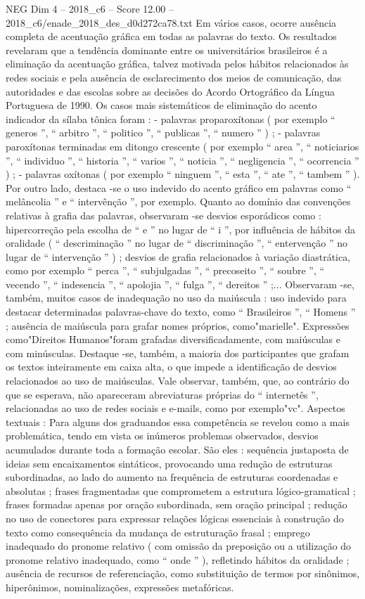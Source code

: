 \begin{textsample}{NEG Dim 4 – 2018\_c6 – Score 12.00 – 2018\_c6/enade\_2018\_des\_d0d272ca78.txt}
Em vários casos, ocorre ausência completa de acentuação gráfica em todas as palavras do texto.
Os resultados revelaram que a tendência dominante entre os universitários brasileiros é a eliminação da acentuação gráfica, talvez motivada pelos hábitos relacionados às redes sociais e pela ausência de esclarecimento dos meios de comunicação, das autoridades e das escolas sobre as decisões do Acordo Ortográfico da Língua Portuguesa de 1990.
Os casos mais sistemáticos de eliminação do acento indicador da sílaba tônica foram : - palavras proparoxítonas ( por exemplo “ generos ”, “ arbitro ”, “ politico ”, “ publicas ”, “ numero ” ) ; - palavras paroxítonas terminadas em ditongo crescente ( por exemplo “ area ”, “ noticiarios ”, “ individuo ”, “ historia ”, “ varios ”, “ noticia ”, “ negligencia ”, “ ocorrencia ” ) ; - palavras oxítonas ( por exemplo “ ninguem ”, “ esta ”, “ ate ”, “ tambem ” ).
Por outro lado, destaca -se o uso indevido do acento gráfico em palavras como “ melâncolia ” e “ intervênção ”, por exemplo.
Quanto ao domínio das convenções relativas à grafia das palavras, observaram -se desvios esporádicos como : hipercorreção pela escolha de “ e ” no lugar de “ i ”, por influência de hábitos da oralidade ( “ descriminação ” no lugar de “ discriminação ”, “ entervenção ” no lugar de “ intervenção ” ) ; desvios de grafia relacionados à variação diastrática, como por exemplo “ perca ”, “ subjulgadas ”, “ precoseito ”, “ soubre ”, “ vecendo ”, “ indesencia ”, “ apolojia ”, “ fulga ”, “ dereitos ” ;...
Observaram -se, também, muitos casos de inadequação no uso da maiúscula : uso indevido para destacar determinadas palavras-chave do texto, como “ Brasileiros ”, “ Homens ” ; ausência de maiúscula para grafar nomes próprios, como"marielle".
Expressões como"Direitos Humanos"foram grafadas diversificadamente, com maiúsculas e com minúsculas.
Destaque -se, também, a maioria dos participantes que grafam os textos inteiramente em caixa alta, o que impede a identificação de desvios relacionados ao uso de maiúsculas.
Vale observar, também, que, ao contrário do que se esperava, não apareceram abreviaturas próprias do “ internetês ”, relacionadas ao uso de redes sociais e e-mails, como por exemplo"vc".
Aspectos textuais : Para alguns dos graduandos essa competência se revelou como a mais problemática, tendo em vista os inúmeros problemas observados, desvios acumulados durante toda a formação escolar.
São eles : sequência justaposta de ideias sem encaixamentos sintáticos, provocando uma redução de estruturas subordinadas, ao lado do aumento na frequência de estruturas coordenadas e absolutas ; frases fragmentadas que comprometem a estrutura lógico-gramatical ; frases formadas apenas por oração subordinada, sem oração principal ; redução no uso de conectores para expressar relações lógicas essenciais à construção do texto como consequência da mudança de estruturação frasal ; emprego inadequado do pronome relativo ( com omissão da preposição ou a utilização do pronome relativo inadequado, como “ onde ” ), refletindo hábitos da oralidade ; ausência de recursos de referenciação, como substituição de termos por sinônimos, hiperônimos, nominalizações, expressões metafóricas.

\end{textsample}
